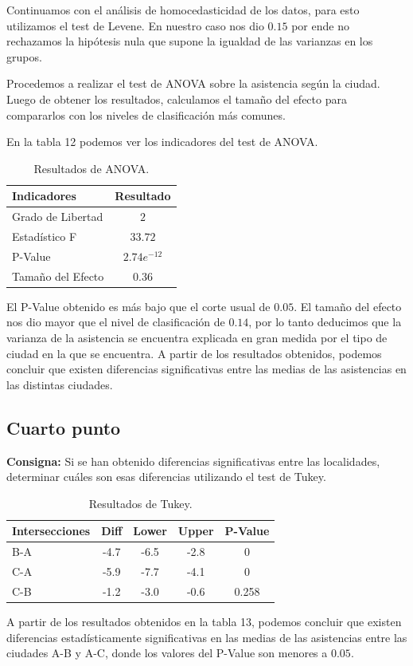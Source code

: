 \documentclass{article} %
\begin{document}
Continuamos con el análisis de homocedasticidad de los datos, para esto utilizamos el test de Levene. En nuestro caso nos dio $0.15$ por ende no rechazamos la hipótesis nula que supone la igualdad de las varianzas en los grupos.

Procedemos a realizar el test de ANOVA sobre la asistencia según la ciudad. Luego de obtener los resultados, calculamos el tamaño del efecto para compararlos con los niveles de clasificación más comunes. 

En la tabla 12 podemos ver los indicadores del test de ANOVA.

\begin{table}[H]
	\centering
		\begin{tabular}{||l | c||}
			\hline
			\hline
			Indicadores & Resultado\\
			\hline			
			\hline
			Grado de Libertad & $2$\\
			\hline
			Estadístico F & $33.72$\\
			\hline
			P-Value & $2.74e^{-12}$\\
			\hline
			Tamaño del Efecto & $0.36$\\
			\hline
			\hline
		\end{tabular}
		\caption{Resultados de ANOVA.}
	\label{tab:table-punto-4-3}
\end{table}

El P-Value obtenido es más bajo que el corte usual de $0.05$. El tamaño del efecto nos dio mayor que el nivel de clasificación de $0.14$, por lo tanto deducimos que la varianza de la asistencia se encuentra explicada en gran medida por el tipo de ciudad en la que se encuentra. A partir de los resultados obtenidos, podemos concluir que existen diferencias significativas entre las medias de las asistencias en las distintas ciudades.

\subsection{Cuarto punto}

\textbf{Consigna:} Si se han obtenido diferencias significativas entre las localidades, determinar cuáles son esas diferencias utilizando el test de Tukey.


\begin{table}[H]
	\centering
		\begin{tabular}{||l | c | c | c | c ||}
			\hline
			\hline
			Intersecciones & Diff & Lower & Upper & P-Value\\
			\hline			
			\hline
			B-A & -4.7 & -6.5 & -2.8 & 0\\
			\hline
			C-A & -5.9 & -7.7 & -4.1 & 0\\
			\hline
			C-B & -1.2 & -3.0 & -0.6 & 0.258\\
			\hline
			\hline
		\end{tabular}
		\caption{Resultados de Tukey.}
	\label{tab:table-punto-4-3}
\end{table}

A partir de los resultados obtenidos en la tabla 13, podemos concluir que existen diferencias estadísticamente significativas en las medias de las asistencias entre las ciudades A-B y A-C, donde los valores del P-Value son menores a $0.05$.
\end{document}
